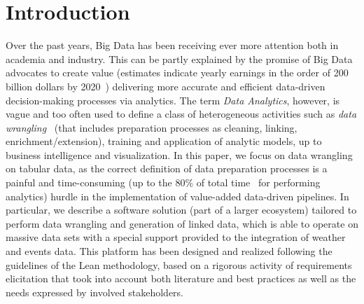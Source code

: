 \section{Introduction}



Over the past years, Big Data has been receiving ever more attention both in academia and industry. 
This can be partly explained by the promise of Big Data advocates to create value (estimates indicate yearly earnings in the order of 200 billion dollars by 2020~\cite{idc_analytics}) delivering more accurate and efficient data-driven decision-making processes via analytics. 
The term \textit{Data Analytics}, however, is vague and too often used to define a class of heterogeneous activities such as \textit{data wrangling}~\cite{furche2016data} (that includes preparation processes as cleaning, linking, enrichment/extension), training and application of analytic models, up to business intelligence and visualization. 
In this paper, we focus on data wrangling on tabular data, as the correct definition of data preparation processes is a painful and time-consuming (up to the 80\% of total time~\cite{lohr2014big} for performing analytics) hurdle in the implementation of value-added data-driven pipelines.
In particular, we describe a software solution (part of a larger ecosystem) tailored to perform data wrangling and generation of linked data, which is able to operate on massive data sets with a special support provided to the integration of weather and events data. This platform has been designed and realized following the guidelines of the Lean methodology, based on a rigorous activity of requirements elicitation that took into account both literature and best practices as well as the needs expressed by involved stakeholders. 


